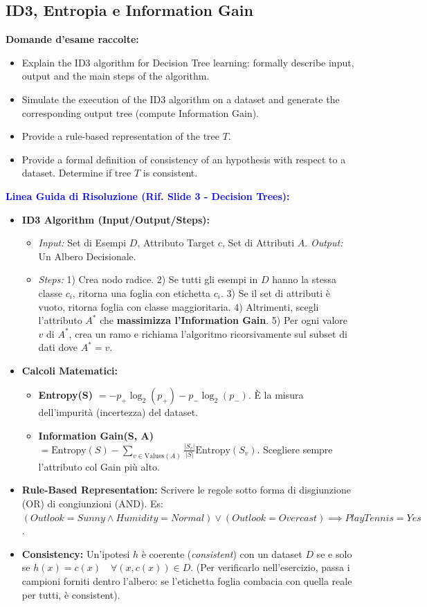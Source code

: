 \documentclass[11pt,a4paper]{article}
\begin{document}
\subsection{ID3, Entropia e Information Gain}
\textbf{Domande d'esame raccolte:}
\begin{itemize}
    \item Explain the ID3 algorithm for Decision Tree learning: formally describe input, output and the main steps of the algorithm.
    \item Simulate the execution of the ID3 algorithm on a dataset and generate the corresponding output tree (compute Information Gain).
    \item Provide a rule-based representation of the tree $T$.
    \item Provide a formal definition of consistency of an hypothesis with respect to a dataset. Determine if tree $T$ is consistent.
\end{itemize}

\textbf{\textcolor{blue}{Linea Guida di Risoluzione (Rif. Slide 3 - Decision Trees):}}
\begin{itemize}
    \item \textbf{ID3 Algorithm (Input/Output/Steps):}
    \begin{itemize}
        \item \textit{Input:} Set di Esempi $D$, Attributo Target $c$, Set di Attributi $A$. \textit{Output:} Un Albero Decisionale.
        \item \textit{Steps:} 1) Crea nodo radice. 2) Se tutti gli esempi in $D$ hanno la stessa classe $c_i$, ritorna una foglia con etichetta $c_i$. 3) Se il set di attributi è vuoto, ritorna foglia con classe maggioritaria. 4) Altrimenti, scegli l'attributo $A^*$ che \textbf{massimizza l'Information Gain}. 5) Per ogni valore $v$ di $A^*$, crea un ramo e richiama l'algoritmo ricorsivamente sul subset di dati dove $A^* = v$.
    \end{itemize}
    \item \textbf{Calcoli Matematici:}
    \begin{itemize}
        \item \textbf{Entropy(S)} $= -p_+ \log_2(p_+) - p_- \log_2(p_-)$. È la misura dell'impurità (incertezza) del dataset.
        \item \textbf{Information Gain(S, A)} $= \text{Entropy}(S) - \sum_{v \in \text{Values}(A)} \frac{|S_v|}{|S|} \text{Entropy}(S_v)$. Scegliere sempre l'attributo col Gain più alto.
    \end{itemize}
    \item \textbf{Rule-Based Representation:} Scrivere le regole sotto forma di disgiunzione (OR) di congiunzioni (AND). Es: \\
    $(Outlook = Sunny \land Humidity = Normal) \lor (Outlook = Overcast) \implies PlayTennis = Yes$.
    \item \textbf{Consistency:} Un'ipotesi $h$ è coerente (\textit{consistent}) con un dataset $D$ se e solo se $h(x) = c(x) \quad \forall (x, c(x)) \in D$. (Per verificarlo nell'esercizio, passa i campioni forniti dentro l'albero: se l'etichetta foglia combacia con quella reale per tutti, è consistent).
\end{itemize}
\end{document}
